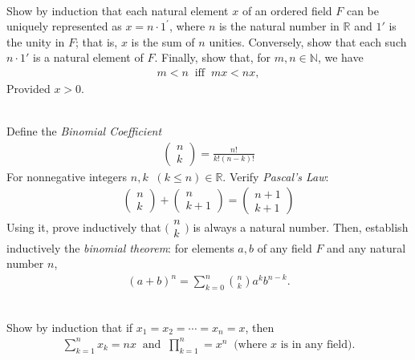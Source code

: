 \documentclass[12pt]{book}
\newcommand{\N}{\mathbb{N}}
\theoremstyle{definition}
\begin{document}
\begin{ex}[$11^\prime$ ]
\\
Show by induction that each natural element $x$ of an ordered field $F$ can be uniquely represented as $x=n\cdot 1^{\prime}$, where $n$ is the natural number in $\mathbb{R}$ and $1'$ is the unity in $F$; that is, $x$ is the sum of $n$ unities. 
Conversely, show that each such $n\cdot 1'$ is a natural element of $F$. Finally, show that, for $m,n \in \N$, we have
\begin{align*}
	m<n\;\; \text{iff}\;\; mx<nx, 
\end{align*}
Provided $x>0$.  	
\end{ex}
\begin{ex}[12]
\\
Define the \textit{Binomial Coefficient}
\begin{align*}
\begin{pmatrix}
	n \\
	k
\end{pmatrix}  = \frac{n!}{k!(n-k)!}	
\end{align*}
For nonnegative integers $n,k\;\; (k \leq n) \in \mathbb{R}$. Verify \textit{Pascal's Law}:
\begin{align*}
	\begin{pmatrix} n \\ k \end{pmatrix} + \begin{pmatrix} n \\ k+1 \end{pmatrix} = \begin{pmatrix}n+1 \\ k+1 \end{pmatrix}
\end{align*}
Using it, prove inductively that $\big(\begin{smallmatrix} n \\ k\end{smallmatrix} \big)$ is always a natural number. Then, establish inductively the \textit{binomial theorem}: for elements $a,b$ of any field $F$ and any natural number $n$,
\begin{align*}
	(a+b)^n = \sum_{k=0}^n \binom{n}{k} a^k b^{n-k}.
\end{align*}
\end{ex}
\begin{ex}[13]
\\
Show by induction that if $x_1 = x_2 = \cdots = x_n = x$, then
\begin{align*}
	\sum_{k=1}^n x_k = nx \;\; \text{and}\;\; \prod_{k=1}^n = x^n\;\; \text{(where $x$ is in any field).}  
\end{align*} 	
\end{ex}
\end{document}
